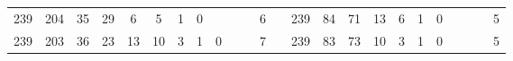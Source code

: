 {\begin{tabular}{cccccccccccclccccccccccc}
239                                                & 204                                                & 35                                               & 29                                               & 6                                                & 5                                                & 1                                               & 0                                               &                                                 &                                                 &                                                 & 6                                                &                          & 239                                                & 84                                                 & 71                                               & 13                                               & 6                                               & 1                                               & 0                                               &                                                 &                                                 &                                                 & 5                                                \\
239                                                & 203                                                & 36                                               & 23                                               & 13                                               & 10                                               & 3                                               & 1                                               & 0                                               &                                                 &                                                 & 7                                                &                          & 239                                                & 83                                                 & 73                                               & 10                                               & 3                                               & 1                                               & 0                                               &                                                 &                                                 &                                                 & 5                                                \\

\end{tabular}}
